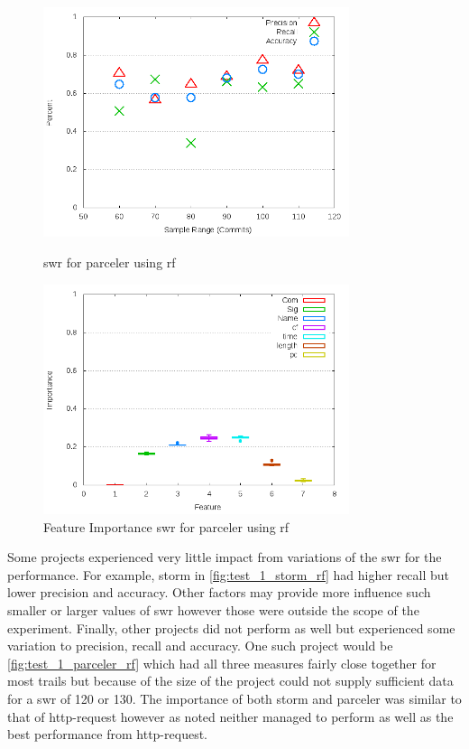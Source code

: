 \begin{figure}[!t]
    \centering
        \includegraphics[width=0.8\textwidth]{images/rf/test_1/parceler_sample_range}
        \caption{\gls{swr} for parceler using \gls{rf}}
        \label{fig:test_1_parceler_rf}

    \includegraphics[width=0.8\textwidth]{images/rf/test_1/parceler_importance}
        \caption{Feature Importance \gls{swr} for parceler using \gls{rf}}
        \label{fig:test_1_parceler_rf_importance}
\end{figure}

Some projects experienced very little impact from variations of the \gls{swr} for the performance. For example, storm in \autoref{fig:test_1_storm_rf} had higher recall but lower precision and accuracy. Other factors may provide more influence such smaller or larger values of \gls{swr} however those were outside the scope of the experiment. Finally, other projects did not perform as well but experienced some variation to precision, recall and accuracy. One such project would be \autoref{fig:test_1_parceler_rf} which had all three measures fairly close together for most trails but because of the size of the project could not supply sufficient data for a \gls{swr} of 120 or 130. The importance of both storm and parceler was similar to that of http-request however as noted neither managed to perform as well as the best performance from http-request.

